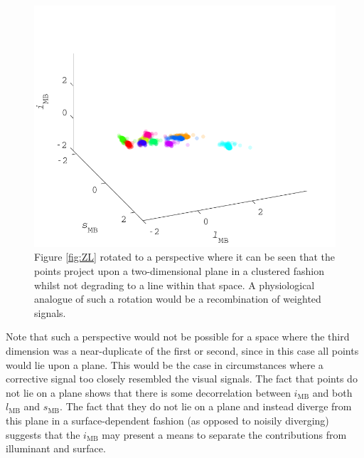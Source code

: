 \begin{figure}[htbp] %
\includegraphics[max width=\textwidth]{figs/comp/thirdDimension/viewpoint.pdf}
 \caption{Figure \ref{fig:ZL} rotated to a perspective where it can be seen that the points project upon a two-dimensional plane in a clustered fashion whilst not degrading to a line within that space. A physiological analogue of such a rotation would be a recombination of weighted signals.}
 \label{fig:viewpoint}
\end{figure} 

Note that such a perspective would not be possible for a space where the third dimension was a near-duplicate of the first or second, since in this case all points would lie upon a plane. This would be the case in circumstances where a corrective signal too closely resembled the visual signals. The fact that points do not lie on a plane shows that there is some decorrelation between $i_{\text{MB}}$ and both $l_{\text{MB}}$ and $s_{\text{MB}}$. The fact that they do not lie on a plane and instead diverge from this plane in a surface-dependent fashion (as opposed to noisily diverging) suggests that the $i_{\text{MB}}$ may present a means to separate the contributions from illuminant and surface. 


